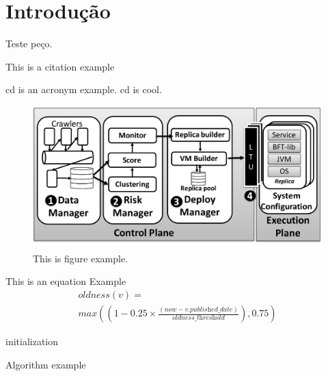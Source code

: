 \chapter{Introdução}
\label{chap:introduction}

Teste peço.


This is a citation example~\cite{Garcia:2019}

\gls{cd} is an acronym example. \gls{cd} is cool.

\begin{figure}[h]
\begin{center}
\includegraphics[width=\columnwidth]{images/figure_example.pdf}
\caption{This is figure example.}
\label{fig:overview}
\end{center}
\end{figure}



This is an equation Example
\begin{equation} 
\begin{split}
\textit{oldness}(v)=\\\textit{max}\left((1-0.25\times\frac{(\textit{now}-v.\textit{published\_date})}{\textit{oldness\_threshold}}), 0.75\right)
\label{eq:oldness}
\end{split}
\end{equation}

\begin{algorithm}[H]
\SetAlgoLined
{}
 initialization\;
 \caption{Algorithm example}
\end{algorithm}



